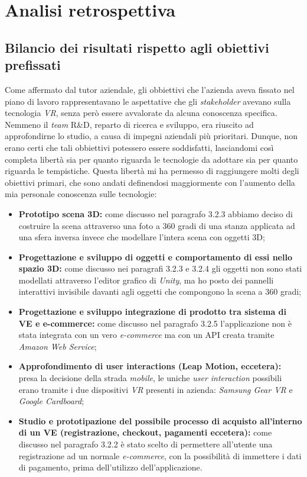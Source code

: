 \newpage
\chapter{Analisi retrospettiva}
\label{cap:analisiretrospettiva}

\section{Bilancio dei risultati rispetto agli obiettivi prefissati}

Come affermato dal tutor aziendale, gli obbiettivi che l'azienda aveva fissato nel piano di lavoro rappresentavano le aspettative che gli \textit{stakeholder}\hyperlink{sh}{} avevano sulla tecnologia \textit{VR}, senza però essere avvalorate da alcuna conoscenza specifica. Nemmeno il \textit{team} R\&D, reparto di ricerca e sviluppo, era riuscito ad approfondirne lo studio, a causa di impegni aziendali più prioritari. Dunque, non erano certi che tali obbiettivi potessero essere soddisfatti, lasciandomi così completa libertà sia per quanto riguarda le tecnologie da adottare sia per quanto riguarda le tempistiche. Questa libertà mi ha permesso di raggiungere molti degli obiettivi primari, che sono andati definendosi maggiormente con l'aumento della mia personale conoscenza sulle tecnologie:
\begin{itemize}
	\item \textbf{Prototipo scena 3D:} come discusso nel paragrafo 3.2.3 abbiamo deciso di costruire la scena attraverso una foto a 360 gradi di una stanza applicata ad una sfera inversa invece che modellare l'intera scena con oggetti 3D;
	\item \textbf{Progettazione e sviluppo di oggetti e comportamento di essi nello spazio 3D:} come discusso nei paragrafi 3.2.3 e 3.2.4 gli oggetti non sono stati modellati attraverso l'editor grafico di \textit{Unity}, ma ho posto dei pannelli interattivi invisibile davanti agli oggetti che compongono la scena a 360 gradi;
	\item \textbf{Progettazione e sviluppo integrazione di prodotto tra sistema di VE e e-commerce:} come discusso nel paragrafo 3.2.5 l'applicazione non è stata integrata con un vero \textit{e-commerce} ma con un API creata tramite \textit{Amazon Web Service};
	\item \textbf{Approfondimento di user interactions (Leap Motion, eccetera):} presa la decisione della strada \textit{mobile}, le uniche \textit{user interaction} possibili erano tramite i due dispositivi \textit{VR} presenti in azienda: \textit{Samsung Gear VR} e \textit{Google Cardboard};
	\item \textbf{Studio e prototipazione del possibile processo di acquisto all’interno di un VE (registrazione, checkout, pagamenti eccetera):} come discusso nel paragrafo 3.2.2 è stato scelto di permettere all'utente una registrazione ad un normale \textit{e-commerce}, con la possibilità di immettere i dati di pagamento, prima dell'utilizzo dell'applicazione.
\end{itemize} 

